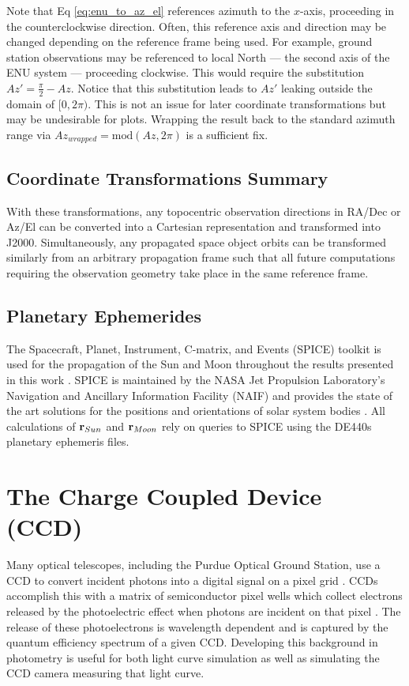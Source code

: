 Note that Eq \ref{eq:enu_to_az_el} references azimuth to the $x$-axis, proceeding in the
counterclockwise direction. Often, this reference axis and direction may be changed depending on the
reference frame being used. For example, ground station observations may be referenced to local
North ---  the second axis of the ENU system ---  proceeding clockwise. This would require the
substitution $Az' = \frac{\pi}{2} - Az$. Notice that this substitution leads to $Az'$ leaking
outside the domain of $[0, 2\pi)$. This is not an issue for later coordinate transformations but
may be undesirable for plots. Wrapping the result back to the standard azimuth range via
$Az_{wrapped} = \textrm{mod}(Az, 2\pi)$ is a sufficient fix.

\subsection{Coordinate Transformations Summary}

With these transformations, any topocentric observation directions in RA/Dec or Az/El can be converted into a Cartesian representation and transformed into J2000. Simultaneously, any propagated space object orbits can be transformed similarly from an arbitrary propagation frame such that all future computations requiring the observation geometry take place in the same reference frame. 

\subsection{Planetary Ephemerides} \label{sec:planet_ephem}

The Spacecraft, Planet, Instrument, C-matrix, and Events (SPICE) toolkit is used for the propagation of the Sun and Moon throughout the results presented in this work \cite{spice}. SPICE is maintained by the NASA Jet Propulsion Laboratory's Navigation and Ancillary Information Facility (NAIF) and provides the state of the art solutions for the positions and orientations of solar system bodies \cite{spice}. All calculations of $\mathbf{r}_{Sun}$ and $\mathbf{r}_{Moon}$ rely on queries to SPICE using the DE440s planetary ephemeris files.

\section{The Charge Coupled Device (CCD)} \label{sec:ccd_performance}

Many optical telescopes, including the Purdue Optical Ground Station, use a CCD to convert incident photons into a digital signal on a pixel grid \cite{krag2003}. CCDs accomplish this with a matrix of semiconductor pixel wells which collect electrons released by the photoelectric effect when photons are incident on that pixel \cite{krag2003}. The release of these photoelectrons is wavelength dependent and is captured by the quantum efficiency spectrum of a given CCD. Developing this background in photometry is useful for both light curve simulation as well as simulating the CCD camera measuring that light curve. 

